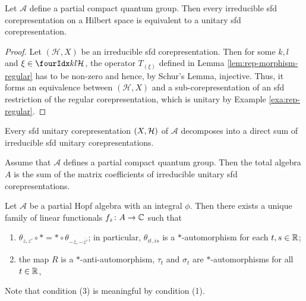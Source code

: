 \begin{Prop}  \label{prop:rep-unitarisable}
  Let $\mathscr{A}$ define a partial compact quantum group. Then every irreducible sfd corepresentation on a Hilbert space
  is equivalent to a unitary sfd corepresentation.
\end{Prop}
\begin{proof}
  Let $(\mathcal{H},X)$ be an irreducible sfd
  corepresentation. Then for some $k,l$ and $\xi \in
  \Gru{\mathcal{H}}{k}{l}$,  the operator  $T_{(\xi)}$  defined in
  Lemma \ref{lem:rep-morphism-regular} has to be non-zero and hence,
  by Schur's Lemma, injective. Thus, it forms an equivalence between
  $(\mathcal{H},X)$ and a sub-corepresentation of an sfd
  restriction of the regular corepresentation, which is unitary by
  Example \ref{exa:rep-regular}.
\end{proof}

\begin{Lem} Every sfd unitary corepresentation $(X,\mathcal{H})$ of $\mathscr{A}$ decomposes into a direct sum of irreducible sfd unitary corepresentations.
\end{Lem} 
\begin{Prop} \label{prop:rep-weak-pw}
  Assume that $\mathscr{A}$ defines a partial compact quantum group. Then the total algebra $A$ is the sum of the matrix coefficients of
 irreducible unitary sfd corepresentations.
\end{Prop}


\begin{Theorem} \label{thm:rep-characters} Let $\mathscr{A}$ be a
  partial Hopf algebra with an integral $\phi$.  Then there exists a unique
  family of linear functionals $f_{z} \colon A\to \mathbb{C}$ such that
\begin{enumerate}[label={(\arabic*)}]
  \item $\theta_{z,z'} \circ * = * \circ
    \theta_{-\overline{z},-\overline{z'}}$; in particular,
    $\theta_{it,is}$ is a $*$-automorphism for each $t,s\in \mathbb{R}$;
  \item  the map $R$ is a $*$-anti-automorphism,  $\tau_{t}$ and
$\sigma_{t}$ are $*$-automorphisms for all $t\in \mathbb{R}$,
\end{enumerate}
\end{Theorem}


Note that condition (3) is meaningful by condition (1).

